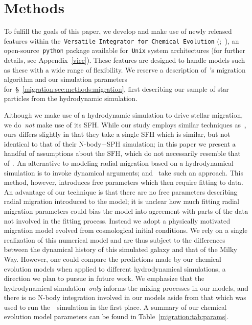 
\section{Methods} 
\label{migration:sec:methods} 
To fulfill the goals of this paper, we develop and make use of newly released 
features within the~\texttt{Versatile Integrator for Chemical Evolution} 
(\vice;~\citealp{Johnson2020}), an open-source~\texttt{python} package 
available for~\texttt{Unix} system architectures (for further details, see 
Appendix~\ref{vice}). 
These features are designed to handle models such as these with a wide range of 
flexibility. 
We reserve a description of~\vice's migration algorithm and our simulation 
parameters for~\S~\ref{migration:sec:methods:migration}, first describing our sample of 
star particles from the hydrodynamic simulation. 
\par 
Although we make use of a hydrodynamic simulation to drive stellar migration, 
we do~\textit{not} make use of its SFH. 
While our study employs similar techniques as~\citet{Minchev2013}, ours differs 
slightly in that they take a single SFH which is similar, but not identical to 
that of their N-body+SPH simulation; in this paper we present a handful of 
assumptions about the SFH, which do not necessarily resemble that of~\hsim. 
An alternative to modeling radial migration based on a 
hydrodynamical simulation is to invoke dynamical arguments; 
\citet{Schoenrich2009a} and~\citet{Sharma2021} take such an approach. 
This method, however, introduces free parameters which then require fitting to 
data. 
An advantage of our technique is that there are no free parameters describing 
radial migration introduced to the model; it is unclear how much 
fitting radial migration parameters could bias the model into agreement with 
parts of the data not involved in the fitting process. 
Instead we adopt a physically motivated migration model evolved from 
cosmological initial conditions. 
We rely on a single realization of this numerical model and are thus subject to 
the differences between the dynamical history of this simulated galaxy and that 
of the Milky Way. 
However, one could compare the predictions made by our chemical evolution 
models when applied to different hydrodynamical simulations, a direction we 
plan to pursue in future work. 
We emphasize that the hydrodynamical simulation~\textit{only} informs the 
mixing processes in our models, and there is no N-body integration involved in 
our models aside from that which was used to run the~\hsim~simulation in the 
first place. 
A summary of our chemical evolution model parameters can be found in 
Table~\ref{migration:tab:params}. 

